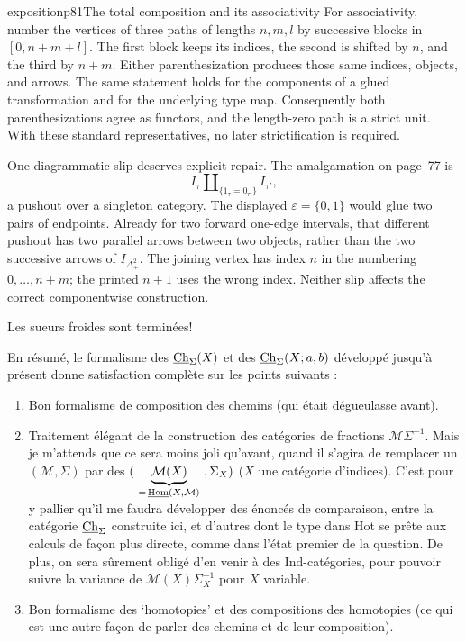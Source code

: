 \begin{dcomment}{exposition}{p81}{The total composition and its associativity}
For associativity, number the vertices of three paths of lengths $n,m,l$ by successive blocks in $[0,n+m+l]$. The first block keeps its indices, the second is shifted by $n$, and the third by $n+m$. Either parenthesization produces those same indices, objects, and arrows. The same statement holds for the components of a glued transformation and for the underlying type map. Consequently both parenthesizations agree as functors, and the length-zero path is a strict unit. With these standard representatives, no later strictification is required.

One diagrammatic slip deserves explicit repair. The amalgamation on page~77 is
\[
 I_\tau\amalg_{\{1_\tau=0_{\tau'}\}}I_{\tau'},
\]
a pushout over a singleton category. The displayed $\varepsilon=\{0,1\}$ would glue two pairs of endpoints. Already for two forward one-edge intervals, that different pushout has two parallel arrows between two objects, rather than the two successive arrows of $I_{\Delta_+^2}$. The joining vertex has index $n$ in the numbering $0,\ldots,n+m$; the printed $n+1$ uses the wrong index. Neither slip affects the correct componentwise construction.
\end{dcomment}


Les sueurs froides sont terminées!

En résumé, le formalisme des $\underline{\mathrm{Ch}}_{\Sigma}(X)$ et des $\underline{\mathrm{Ch}}_{\Sigma}(X;a,b)$ développé jusqu'à présent donne satisfaction complète sur les points suivants :

\begin{enumerate}
\item[a)] Bon formalisme de composition des chemins (qui était dégueulasse avant).

\item[b)] Traitement élégant de la construction des catégories de fractions $\mathcal{M}\Sigma^{-1}$. Mais je m'attends que ce sera moins joli qu'avant, quand il s'agira de remplacer un $(\mathcal{M},\Sigma)$ par des $(\ \underbrace{\mathcal{M}(X)}_{=\,\uHom(X,\mathcal{M})}\ ,\Sigma_X)$ ($X$ une catégorie d'indices). C'est pour y pallier qu'il me faudra développer des énoncés de comparaison, entre la catégorie $\underline{\mathrm{Ch}}_{\Sigma}$ construite ici, et d'autres dont le type dans Hot se prête aux calculs de façon plus directe, comme dans l'état premier de la question. De plus, on sera sûrement obligé d'en venir à des Ind-catégories, pour pouvoir suivre la variance de $\mathcal{M}(X)\Sigma_X^{-1}$ pour $X$ variable.

\item[c)] Bon formalisme des `homotopies' et des compositions des homotopies (ce qui est une autre façon de parler des chemins et de leur composition).
\end{enumerate}

